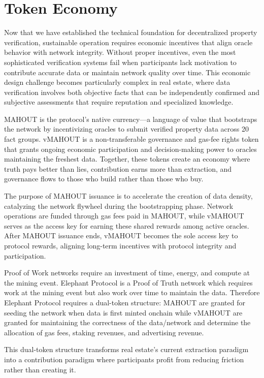 \chapter{Token Economy}

Now that we have established the technical foundation for decentralized property verification, sustainable operation requires economic incentives that align oracle behavior with network integrity. Without proper incentives, even the most sophisticated verification systems fail when participants lack motivation to contribute accurate data or maintain network quality over time. This economic design challenge becomes particularly complex in real estate, where data verification involves both objective facts that can be independently confirmed and subjective assessments that require reputation and specialized knowledge.

MAHOUT is the protocol's native currency---a language of value that bootstraps the network by incentivizing oracles to submit verified property data across 20 fact groups. vMAHOUT is a non-transferable governance and gas-fee rights token that grants ongoing economic participation and decision-making power to oracles maintaining the freshest data. Together, these tokens create an economy where truth pays better than lies, contribution earns more than extraction, and governance flows to those who build rather than those who buy.

The purpose of MAHOUT issuance is to accelerate the creation of data density, catalyzing the network flywheel during the bootstrapping phase. Network operations are funded through gas fees paid in MAHOUT, while vMAHOUT serves as the access key for earning these shared rewards among active oracles. After MAHOUT issuance ends, vMAHOUT becomes the sole access key to protocol rewards, aligning long-term incentives with protocol integrity and participation.

Proof of Work networks require an investment of time, energy, and compute at the mining event. Elephant Protocol is a Proof of Truth network which requires work at the mining event but also work over time to maintain the data. Therefore Elephant Protocol requires a dual-token structure: MAHOUT are granted for seeding the network when data is first minted onchain while vMAHOUT are granted for maintaining the correctness of the data/network and determine the allocation of gas fees, staking revenues, and advertising revenue.

This dual-token structure transforms real estate's current extraction paradigm into a contribution paradigm where participants profit from reducing friction rather than creating it.

